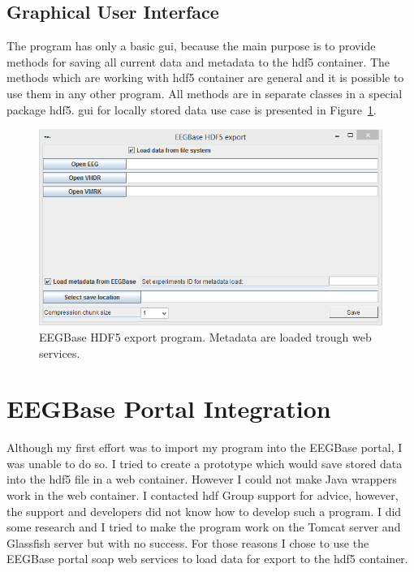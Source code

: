 \subsection{Graphical User Interface}
The program has only a basic \gls{gui}, because the main purpose is to provide methods for saving all current data and metadata to the \gls{hdf5} container. The methods which are working with \gls{hdf5} container are general and it is possible to use them in any other program. All methods are in separate classes in a special package hdf5. \gls{gui} for locally stored data use case is presented in Figure~\ref{program-gui}.

\begin{figure}[h]
	\begin{center}
		\includegraphics[scale=0.7]{obrazky/program_gui2.PNG}
		\caption{EEGBase HDF5 export program. Metadata are loaded trough web services.}
		\label{program-gui}
	\end{center}
\end{figure}

\section{EEGBase Portal Integration}
\label{integration}
Although my first effort was to import my program into the EEGBase portal, I was unable to do so. I tried to create a prototype which would save stored data into the \gls{hdf5} file in a web container. However I could not make Java wrappers work in the web container. I contacted \gls{hdf} Group support for advice, however, the support and developers did not know how to develop such a program. I did some research and I tried to make the program work on the Tomcat server and Glassfish server but with no success. For those reasons I chose to use the EEGBase portal \gls{soap} web services to load data for export to the \gls{hdf5} container.

